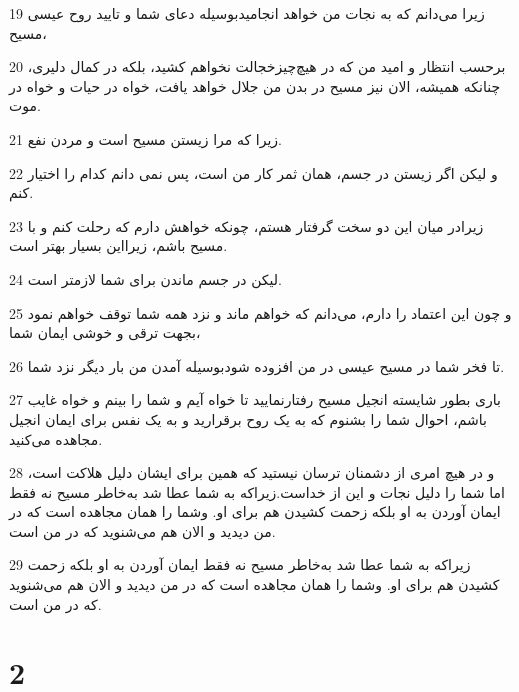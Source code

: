 \par 19 زیرا می‌دانم که به نجات من خواهد انجامیدبوسیله دعای شما و تایید روح عیسی مسیح،
\par 20 برحسب انتظار و امید من که در هیچ‌چیزخجالت نخواهم کشید، بلکه در کمال دلیری، چنانکه همیشه، الان نیز مسیح در بدن من جلال خواهد یافت، خواه در حیات و خواه در موت.
\par 21 زیرا که مرا زیستن مسیح است و مردن نفع.
\par 22 و لیکن اگر زیستن در جسم، همان ثمر کار من است، پس نمی دانم کدام را اختیار کنم.
\par 23 زیرادر میان این دو سخت گرفتار هستم، چونکه خواهش دارم که رحلت کنم و با مسیح باشم، زیرااین بسیار بهتر است.
\par 24 لیکن در جسم ماندن برای شما لازمتر است.
\par 25 و چون این اعتماد را دارم، می‌دانم که خواهم ماند و نزد همه شما توقف خواهم نمود بجهت ترقی و خوشی ایمان شما،
\par 26 تا فخر شما در مسیح عیسی در من افزوده شودبوسیله آمدن من بار دیگر نزد شما.
\par 27 باری بطور شایسته انجیل مسیح رفتارنمایید تا خواه آیم و شما را بینم و خواه غایب باشم، احوال شما را بشنوم که به یک روح برقرارید و به یک نفس برای ایمان انجیل مجاهده می‌کنید.
\par 28 و در هیچ امری از دشمنان ترسان نیستید که همین برای ایشان دلیل هلاکت است، اما شما را دلیل نجات و این از خداست.زیراکه به شما عطا شد به‌خاطر مسیح نه فقط ایمان آوردن به او بلکه زحمت کشیدن هم برای او. وشما را همان مجاهده است که در من دیدید و الان هم می‌شنوید که در من است.
\par 29 زیراکه به شما عطا شد به‌خاطر مسیح نه فقط ایمان آوردن به او بلکه زحمت کشیدن هم برای او. وشما را همان مجاهده است که در من دیدید و الان هم می‌شنوید که در من است.

\chapter{2}

